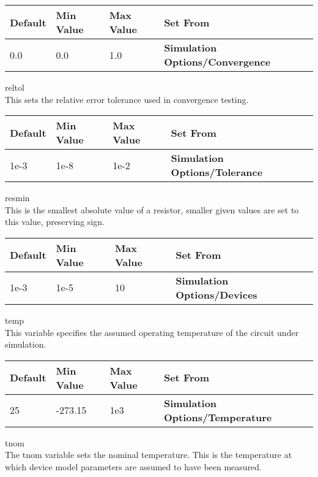 \begin{description}
\begin{tabular}{|l|l|l|l|}\hline
\bf Default & \bf Min Value & \bf Max Value & \bf Set From\\ \hline
0.0 & 0.0 & 1.0 & \bf Simulation Options/Convergence\\ \hline
\end{tabular}

\item{\et reltol}\\
This sets the relative error tolerance used in convergence testing. 

\begin{tabular}{|l|l|l|l|}\hline
\bf Default & \bf Min Value & \bf Max Value & \bf Set From\\ \hline
1e-3 & 1e-8 & 1e-2 & \bf Simulation Options/Tolerance\\ \hline
\end{tabular}

\item{\et resmin}\\
This is the smallest absolute value of a resistor, smaller given
values are set to this value, preserving sign.

\begin{tabular}{|l|l|l|l|}\hline
\bf Default & \bf Min Value & \bf Max Value & \bf Set From\\ \hline
1e-3 & 1e-5 & 10 & \bf Simulation Options/Devices\\ \hline
\end{tabular}

\item{\et temp}\\
This variable specifies the assumed operating temperature of the
circuit under simulation.

\begin{tabular}{|l|l|l|l|}\hline
\bf Default & \bf Min Value & \bf Max Value & \bf Set From\\ \hline
25 & -273.15 & 1e3 & \bf Simulation Options/Temperature\\ \hline
\end{tabular}
 
\item{\et tnom}\\
The {\et tnom} variable sets the nominal temperature.  This is the
temperature at which device model parameters are assumed to have been
measured.


\end{description}
